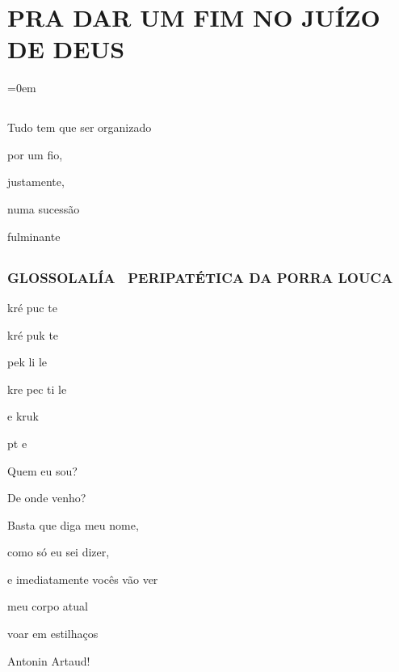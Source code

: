 \pagestyle{fancy}
\part{PRA DAR UM FIM NO JUÍZO DE DEUS}
\parindent=0em

\chapter*{}
\thispagestyle{empty}

\mbox{}\vspace*{\fill}
\begin{center}
Tudo tem que ser organizado

por um fio,

justamente,

numa sucessão

fulminante
\end{center}
\vspace*{\fill}

\chapter*{}
\section*{GLOSSOLALÍA ~PERIPATÉTICA DA PORRA LOUCA}

\begin{center}
kré puc te

kré puk te

pek li le

kre pec ti le

e kruk

pt e
\end{center}



Quem eu sou?

De onde venho?

Basta que diga meu nome,

como só eu sei dizer,

e imediatamente vocês vão ver

meu corpo atual

voar em estilhaços

\pagebreak
{}

Antonin Artaud!



